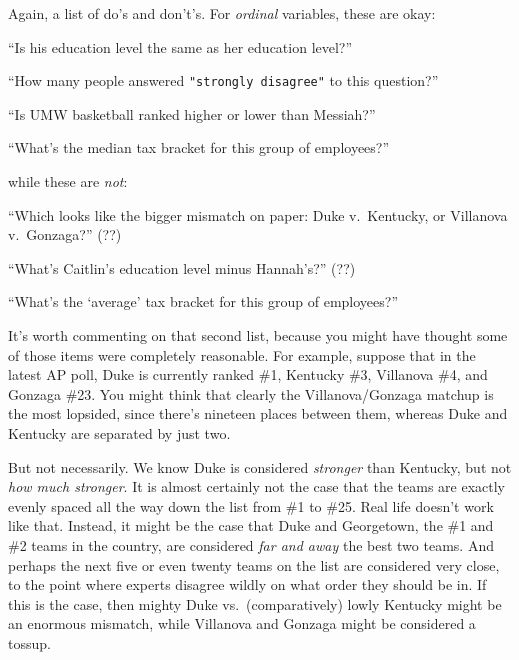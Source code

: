 \medskip
Again, a list of do's and don't's. For \textit{ordinal} variables, these are
okay:

\begin{compactitem}
\item[\leftthumbsup] ``Is his education level the same as her education level?''
\item[\leftthumbsup] ``How many people answered \texttt{"strongly disagree"} to
this question?''
\item[\leftthumbsup] ``Is UMW basketball ranked higher or lower than Messiah?''
\item[\leftthumbsup] ``What's the median tax bracket for this group of
employees?''
\end{compactitem}

\pagebreak
while these are \textit{not}:

\begin{compactitem}
\item[\leftthumbsdown] ``Which looks like the bigger mismatch on paper: Duke
v.~Kentucky, or Villanova v.~Gonzaga?'' (??)
\item[\leftthumbsdown] ``What's Caitlin's education level minus Hannah's?'' (??)
\item[\leftthumbsdown] ``What's the `average' tax bracket for this group of
employees?''
\end{compactitem}

It's worth commenting on that second list, because you might have thought some
of those items were completely reasonable. For example, suppose that in the
latest AP poll, Duke is currently ranked \#1, Kentucky \#3, Villanova \#4, and
Gonzaga \#23. You might think that clearly the Villanova/Gonzaga matchup is the
most lopsided, since there's nineteen places between them, whereas Duke and
Kentucky are separated by just two.

But not necessarily. We know Duke is considered \textit{stronger} than
Kentucky, but not \textit{how much stronger}. It is almost certainly not the
case that the teams are exactly evenly spaced all the way down the list from
\#1 to \#25. Real life doesn't work like that. Instead, it might be the case
that Duke and Georgetown, the \#1 and \#2 teams in the country, are considered
\textit{far and away} the best two teams. And perhaps the next five or even
twenty teams on the list are considered very close, to the point where experts
disagree wildly on what order they should be in. If this is the case, then
mighty Duke vs.~(comparatively) lowly Kentucky might be an enormous mismatch,
while Villanova and Gonzaga might be considered a tossup.

